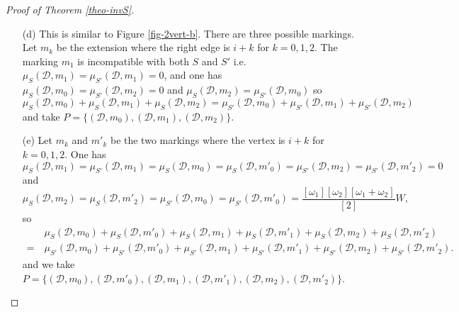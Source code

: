\documentclass[11pt]{article}
\theoremstyle{definition}
\numberwithin{equation}{section}
\newcommand{\D}{\mathcal{D}}
\newcommand{\muSDm}{\mu_S(\D,m)}
\newcommand{\muSSDm}{\mu_{S'}(\D,m)}
\newcommand{\muSDDmk}{\mu_S(\D',m'_0)}
\newcommand{\muSDDmkk}{\mu_S(\D',m'_1)}
\newcommand{\muSDDmkkk}{\mu_S(\D',m'_2)}
\newcommand{\muSSDDmk}{\mu_{S'}(\D',m'_0)}
\newcommand{\muSSDDmkk}{\mu_{S'}(\D',m'_1)}
\newcommand{\muSSDDmkkk}{\mu_{S'}(\D',m'_2)}
\newcommand{\muSDmk}{\mu_S(\D,m_0)}
\newcommand{\muSDmkk}{\mu_S(\D,m_1)}
\newcommand{\muSDmkkk}{\mu_S(\D,m_2)}
\newcommand{\muSDmmk}{\mu_S(\D,m'_0)}
\newcommand{\muSDmmkk}{\mu_S(\D,m'_1)}
\newcommand{\muSDmmkkk}{\mu_S(\D,m'_2)}
\newcommand{\muSSDmk}{\mu_{S'}(\D,m_0)}
\newcommand{\muSSDmkk}{\mu_{S'}(\D,m_1)}
\newcommand{\muSSDmkkk}{\mu_{S'}(\D,m_2)}
\newcommand{\muSSDmmk}{\mu_{S'}(\D,m'_0)}
\newcommand{\muSSDmmkk}{\mu_{S'}(\D,m'_1)}
\newcommand{\muSSDmmkkk}{\mu_{S'}(\D,m'_2)}
\theoremstyle{plain}
\begin{document}
\begin{proof}[Proof of Theorem \ref{theo-invS}]
\begin{enumerate}[label=(\alph*)]
\begin{figure}[h]
\begin{tikzpicture}[scale=1]
\end{tikzpicture}
\caption{Passing from case (c) to case (b).}


	\label{fig-1vertA+}
\end{figure}

Let $\D'$ be the floor diagram of case (c) which gives the diagram $\D$ of case (b) with the $A^+$ operation of Figure \ref{fig-1vertA+}. Let $m'_k$ be the marking of $\D'$ where the right edge is $i+k$ for $k=0,1,2$. 
One has :

\begin{itemize}
 \item $\muSDDmk = \dfrac{[\omega_1][\omega_2-\omega_1][\omega_2]}{[2]} W$ and $\muSSDDmk = [\omega_1]^2 [\omega_2-\omega_1]_2 W$,
 
 \item $\muSDDmkk = \dfrac{[\omega_1][\omega_2-\omega_1][\omega_2]}{[2]} W$ and $\muSSDDmkk = 0$,
 
 \item $\muSDDmkkk = [\omega_1]^2 [\omega_2-\omega_1]_2 W$ and $\muSSDDmkkk = 0$.
\end{itemize}

For $\D$ we have  $\muSDm = [\omega_1]^2 [\omega_2]_2 W$ and $\muSSDm = [\omega_1]_2 [\omega_2]^2 W$. Hence taking $a=\omega_1$ and $b=\omega_2 - \omega_1$ in lemma \ref{lem-quantum} we see that 
   \begin{align*}
       &\ \muSDm + \muSDDmk + \muSDDmkk + \muSDDmkkk \\
       =&\ \muSSDm + \muSSDDmk + \muSSDDmkk + \muSSDDmkkk
   \end{align*}
and we can take $P=\{ (\D,m), (\D',m'_0), (\D',m'_1), (\D',m'_2) \}$.
If $\omega_1 > \omega_2$ the proof is analogous using the symmetric case of Figure \ref{fig-1vert-c} and an operation $A^-$.


\item[(d)] This is similar to Figure \ref{fig-2vert-b}. There are three possible markings. Let $m_k$ be the extension where the right edge is $i+k$ for $k=0,1,2$. The marking $m_1$ is incompatible with both $S$ and $S'$ i.e.  $\muSDmkk = \muSSDmkk = 0$, and one has $\muSDmk = \muSSDmkkk = 0$ and $\muSDmkkk = \muSSDmk$ so
\[  \muSDmk + \muSDmkk + \muSDmkkk = \muSSDmk + \muSSDmkk + \muSSDmkkk \]
and take $P =\{ (\D,m_0),(\D,m_1),(\D,m_2) \}$.

\item[(e)] Let $m_k$ and $m'_k$ be the two markings where the vertex is $i+k$ for $k=0,1,2$. One has
\[ \muSDmkk = \muSSDmkk = \muSDmk = \muSDmmk = \muSSDmkkk = \muSSDmmkkk = 0 \]
and 
\[ \muSDmkkk = \muSDmmkkk = \muSSDmk = \muSSDmmk = \dfrac{[\omega_1][\omega_2][\omega_1+\omega_2]}{[2]} W, \]
 so
\begin{align*}
    &\ \muSDmk + \muSDmmk + \muSDmkk + \muSDmmkk + \muSDmkkk + \muSDmmkkk  \\
    =&\ \muSSDmk + \muSSDmmk + \muSSDmkk + \muSSDmmkk + \muSSDmkkk + \muSSDmmkkk.
\end{align*} 
and we take $P = \{ (\D,m_0), (\D,m'_0), (\D,m_1), (\D,m'_1), (\D,m_2), (\D,m'_2) \}$.



\end{enumerate}
\end{proof}
\end{document}
